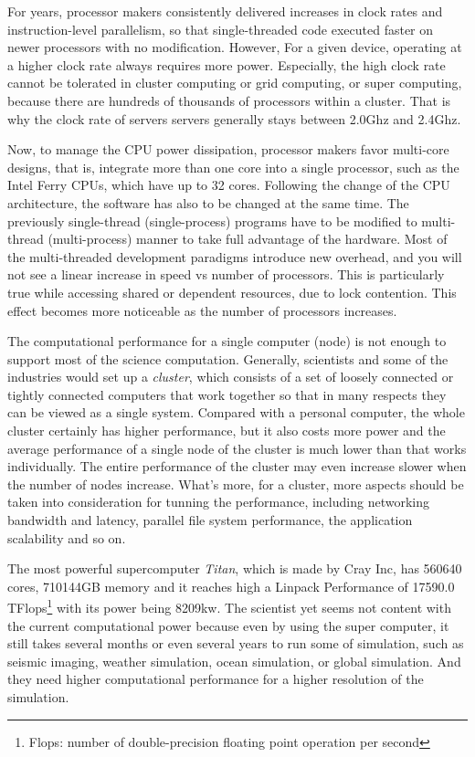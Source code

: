 For years, processor makers consistently delivered increases in clock
rates and instruction-level parallelism, so that single-threaded code
executed faster on newer processors with no modification\cite{herb11}.
However, For a given device, operating at a higher clock rate always
requires more power. Especially, the high clock rate cannot be tolerated
in cluster computing or grid computing, or super computing, because
there are hundreds of thousands of processors within a cluster. That
is why the clock rate of servers servers generally stays between 2.0Ghz
and 2.4Ghz.

Now, to manage the CPU power dissipation, processor makers favor multi-core
designs, that is, integrate more than one core into a single processor,
such as the Intel Ferry CPUs, which have up to 32 cores. Following
the change of the CPU architecture, the software has also to be changed
at the same time. The previously single-thread (single-process) programs
have to be modified to multi-thread (multi-process) manner to take
full advantage of the hardware. Most of the multi-threaded development
paradigms introduce new overhead, and you will not see a linear increase
in speed vs number of processors. This is particularly true while
accessing shared or dependent resources, due to lock contention. This
effect becomes more noticeable as the number of processors increases\cite{moore}.

The computational performance for a single computer (node) is not
enough to support most of the science computation. Generally, scientists
and some of the industries would set up a \emph{cluster}, which consists
of a set of loosely connected or tightly connected computers that
work together so that in many respects they can be viewed as a single
system. Compared with a personal computer, the whole cluster certainly
has higher performance, but it also costs more power and the average
performance of a single node of the cluster is much lower than that
works individually. The entire performance of the cluster may even
increase slower when the number of nodes increase. What's more, for
a cluster, more aspects should be taken into consideration for tunning
the performance, including networking bandwidth and latency, parallel
file system performance, the application scalability and so on.

The most powerful supercomputer \emph{Titan}, which is made by Cray
Inc, has 560640 cores, 710144GB memory and it reaches high a Linpack
Performance of 17590.0 TFlops\footnote {Flops: number of double-precision
floating point operation per second} with its power being 8209kw\cite{top500}.
The scientist yet seems not content with the current computational
power because even by using the super computer, it still takes several
months or even several years to run some of simulation, such as seismic
imaging, weather simulation, ocean simulation, or global simulation.
And they need higher computational performance for a higher resolution
of the simulation.


